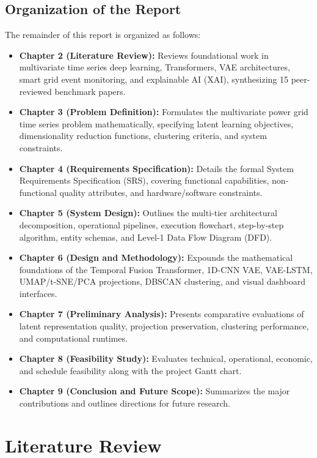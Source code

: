 \documentclass[12pt,a4paper]{report}
\begin{document}
\section{Organization of the Report}
The remainder of this report is organized as follows:
\begin{itemize}
    \item \textbf{Chapter 2 (Literature Review):} Reviews foundational work in multivariate time series deep learning, Transformers, VAE architectures, smart grid event monitoring, and explainable AI (XAI), synthesizing 15 peer-reviewed benchmark papers.
    \item \textbf{Chapter 3 (Problem Definition):} Formulates the multivariate power grid time series problem mathematically, specifying latent learning objectives, dimensionality reduction functions, clustering criteria, and system constraints.
    \item \textbf{Chapter 4 (Requirements Specification):} Details the formal System Requirements Specification (SRS), covering functional capabilities, non-functional quality attributes, and hardware/software constraints.
    \item \textbf{Chapter 5 (System Design):} Outlines the multi-tier architectural decomposition, operational pipelines, execution flowchart, step-by-step algorithm, entity schemas, and Level-1 Data Flow Diagram (DFD).
    \item \textbf{Chapter 6 (Design and Methodology):} Expounds the mathematical foundations of the Temporal Fusion Transformer, 1D-CNN VAE, VAE-LSTM, UMAP/t-SNE/PCA projections, DBSCAN clustering, and visual dashboard interfaces.
    \item \textbf{Chapter 7 (Preliminary Analysis):} Presents comparative evaluations of latent representation quality, projection preservation, clustering performance, and computational runtimes.
    \item \textbf{Chapter 8 (Feasibility Study):} Evaluates technical, operational, economic, and schedule feasibility along with the project Gantt chart.
    \item \textbf{Chapter 9 (Conclusion and Future Scope):} Summarizes the major contributions and outlines directions for future research.
\end{itemize}


\chapter{Literature Review}
\end{document}
